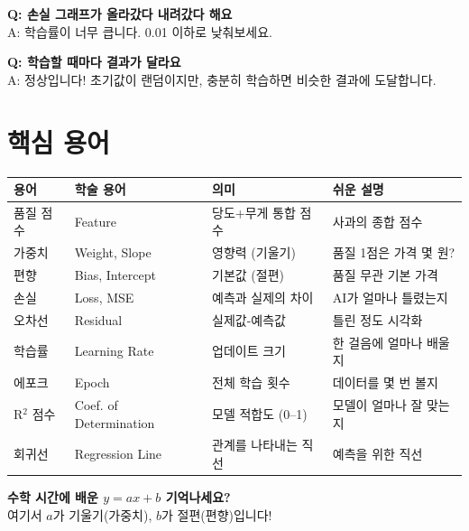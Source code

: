 \documentclass[11pt, a4paper]{article}
\begin{document}
\textbf{Q: 손실 그래프가 올라갔다 내려갔다 해요}\\
A: 학습률이 너무 큽니다. 0.01 이하로 낮춰보세요.

\vspace{0.3cm}

\textbf{Q: 학습할 때마다 결과가 달라요}\\
A: 정상입니다! 초기값이 랜덤이지만, 충분히 학습하면 비슷한 결과에 도달합니다.

\section{핵심 용어}

\begin{center}
\small
\begin{tabular}{llp{4cm}p{4cm}}
    \toprule
    \textbf{용어} & \textbf{학술 용어} & \textbf{의미} & \textbf{쉬운 설명} \\
    \midrule
    품질 점수 & Feature & 당도+무게 통합 점수 & 사과의 종합 점수 \\
    가중치 & Weight, Slope & 영향력 (기울기) & 품질 1점은 가격 몇 원? \\
    편향 & Bias, Intercept & 기본값 (절편) & 품질 무관 기본 가격 \\
    손실 & Loss, MSE & 예측과 실제의 차이 & AI가 얼마나 틀렸는지 \\
    오차선 & Residual & 실제값-예측값 & 틀린 정도 시각화 \\
    학습률 & Learning Rate & 업데이트 크기 & 한 걸음에 얼마나 배울지 \\
    에포크 & Epoch & 전체 학습 횟수 & 데이터를 몇 번 볼지 \\
    R$^2$ 점수 & Coef. of Determination & 모델 적합도 (0--1) & 모델이 얼마나 잘 맞는지 \\
    회귀선 & Regression Line & 관계를 나타내는 직선 & 예측을 위한 직선 \\
    \bottomrule
\end{tabular}
\end{center}

\vspace{0.5cm}

\begin{tipbox}
\textbf{수학 시간에 배운 $y = ax + b$ 기억나세요?}\\
여기서 $a$가 기울기(가중치), $b$가 절편(편향)입니다!
\end{tipbox}
\end{document}
